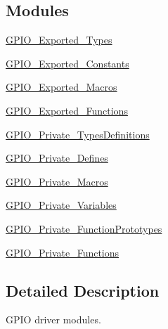 \subsection*{Modules}
\begin{DoxyCompactItemize}
\item 
\hyperlink{group___g_p_i_o___exported___types}{G\+P\+I\+O\+\_\+\+Exported\+\_\+\+Types}
\item 
\hyperlink{group___g_p_i_o___exported___constants}{G\+P\+I\+O\+\_\+\+Exported\+\_\+\+Constants}
\item 
\hyperlink{group___g_p_i_o___exported___macros}{G\+P\+I\+O\+\_\+\+Exported\+\_\+\+Macros}
\item 
\hyperlink{group___g_p_i_o___exported___functions}{G\+P\+I\+O\+\_\+\+Exported\+\_\+\+Functions}
\item 
\hyperlink{group___g_p_i_o___private___types_definitions}{G\+P\+I\+O\+\_\+\+Private\+\_\+\+Types\+Definitions}
\item 
\hyperlink{group___g_p_i_o___private___defines}{G\+P\+I\+O\+\_\+\+Private\+\_\+\+Defines}
\item 
\hyperlink{group___g_p_i_o___private___macros}{G\+P\+I\+O\+\_\+\+Private\+\_\+\+Macros}
\item 
\hyperlink{group___g_p_i_o___private___variables}{G\+P\+I\+O\+\_\+\+Private\+\_\+\+Variables}
\item 
\hyperlink{group___g_p_i_o___private___function_prototypes}{G\+P\+I\+O\+\_\+\+Private\+\_\+\+Function\+Prototypes}
\item 
\hyperlink{group___g_p_i_o___private___functions}{G\+P\+I\+O\+\_\+\+Private\+\_\+\+Functions}
\end{DoxyCompactItemize}


\subsection{Detailed Description}
G\+P\+IO driver modules. 

